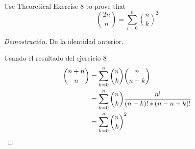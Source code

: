 \item Use Theoretical Exercise 8 to prove that
\[ \binom{2n}{n} = \sum_{i=0}^n \binom{n}{k}^2 \]

\begin{proof}[Demostración] De la identidad anterior.

    Usando el resultado del ejercicio $8$
    \begin{align*}
        \binom{n+n}{n}
        &= \sum_{k=0}^n \binom{n}{k} \binom{n}{n-k}\\
        &= \sum_{k=0}^n \binom{n}{k} \frac{n!}{(n-k)! * (n-n+k)!}\\
        &= \sum_{k=0}^n \binom{n}{k}^2 \qedhere
    \end{align*}
\end{proof}